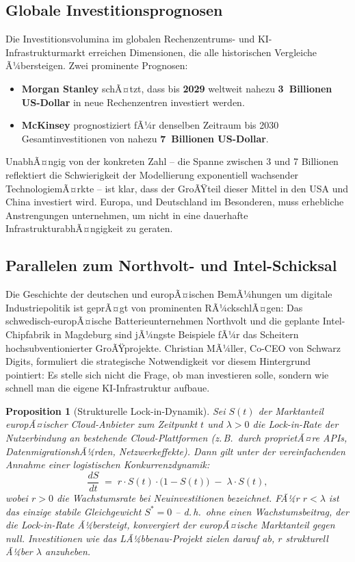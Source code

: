 ﻿\documentclass[12pt, a4paper, openany]{report}
\newtheorem{proposition}[theorem]{Proposition}
\begin{document}
\subsection{Globale Investitionsprognosen}

Die Investitionsvolumina im globalen Rechenzentrums- und KI-Infrastrukturmarkt
erreichen Dimensionen, die alle historischen Vergleiche Ã¼bersteigen. Zwei
prominente Prognosen:

\begin{itemize}[leftmargin=2em]
	\item \textbf{Morgan Stanley} schÃ¤tzt, dass bis \textbf{2029} weltweit
	nahezu \textbf{3~Billionen US-Dollar} in neue Rechenzentren investiert
	werden.
	\item \textbf{McKinsey} prognostiziert fÃ¼r denselben Zeitraum bis 2030
	Gesamtinvestitionen von nahezu \textbf{7~Billionen US-Dollar}.
\end{itemize}

\noindent
UnabhÃ¤ngig von der konkreten Zahl -- die Spanne zwischen 3 und 7 Billionen
reflektiert die Schwierigkeit der Modellierung exponentiell wachsender
TechnologiemÃ¤rkte -- ist klar, dass der GroÃŸteil dieser Mittel in den USA
und China investiert wird. Europa, und Deutschland im Besonderen, muss
erhebliche Anstrengungen unternehmen, um nicht in eine dauerhafte
InfrastrukturabhÃ¤ngigkeit zu geraten.

\subsection{Parallelen zum Northvolt- und Intel-Schicksal}

Die Geschichte der deutschen und europÃ¤ischen BemÃ¼hungen um digitale
Industriepolitik ist geprÃ¤gt von prominenten RÃ¼ckschlÃ¤gen: Das
schwedisch-europÃ¤ische Batterieunternehmen Northvolt und die geplante
Intel-Chipfabrik in Magdeburg sind jÃ¼ngste Beispiele fÃ¼r das Scheitern
hochsubventionierter GroÃŸprojekte. Christian MÃ¼ller, Co-CEO von Schwarz
Digits, formuliert die strategische Notwendigkeit vor diesem Hintergrund
pointiert: Es stelle sich nicht die Frage, ob man investieren solle,
sondern wie schnell man die eigene KI-Infrastruktur aufbaue.

\begin{proposition}[Strukturelle Lock-in-Dynamik]
	\label{prop:lockin}
	Sei $S(t)$ der Marktanteil europÃ¤ischer Cloud-Anbieter zum Zeitpunkt $t$ und
	$\lambda > 0$ die Lock-in-Rate der Nutzerbindung an bestehende
	Cloud-Plattformen (z.\,B.\ durch proprietÃ¤re APIs, DatenmigrationshÃ¼rden,
	Netzwerkeffekte). Dann gilt unter der vereinfachenden Annahme einer
	logistischen Konkurrenzdynamik:
	\[
	\frac{dS}{dt} \;=\; r \cdot S(t)\cdot\bigl(1 - S(t)\bigr)
	\;-\; \lambda \cdot S(t),
	\]
	wobei $r > 0$ die Wachstumsrate bei Neuinvestitionen bezeichnet.
	FÃ¼r $r < \lambda$ ist das einzige stabile Gleichgewicht $S^* = 0$ --
	d.\,h.\ ohne einen Wachstumsbeitrag, der die Lock-in-Rate Ã¼bersteigt,
	konvergiert der europÃ¤ische Marktanteil gegen null. Investitionen wie
	das LÃ¼bbenau-Projekt zielen darauf ab, $r$ strukturell Ã¼ber $\lambda$
	anzuheben.
\end{proposition}
\end{document}
